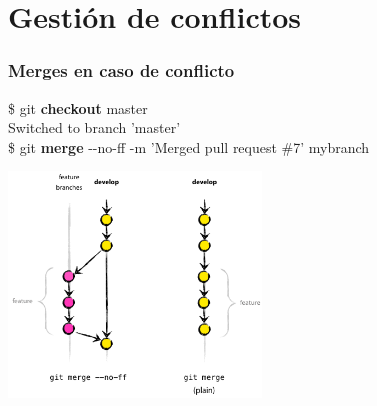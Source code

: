 \section{Gestión de conflictos}
\frame
{
\frametitle{Merges en caso de conflicto}
\$ git \textbf{checkout} master\\
Switched to branch 'master'\\
\$ git \textbf{merge} -{}-no-ff -m 'Merged pull request \#7' mybranch \\

\begin{center}
 \includegraphics[height=6cm]{imgs/gitmerge.png}
\end{center}
}
